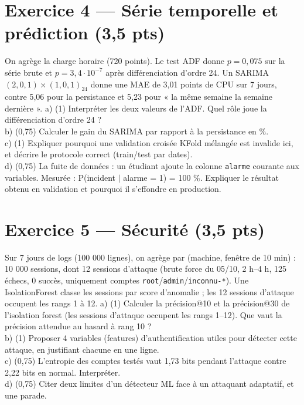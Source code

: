 \documentclass[11pt,a4paper]{article}
\newcommand{\py}[1]{\texttt{\small #1}}
\begin{document}
\section*{Exercice 4 --- Série temporelle et prédiction (3,5 pts)}
On agrège la charge horaire (720 points). Le test ADF donne $p = 0{,}075$ sur la série
brute et $p = 3{,}4\cdot10^{-7}$ après différenciation d'ordre 24.
Un SARIMA $(2,0,1)\times(1,0,1)_{24}$ donne une MAE de 3,01 points de CPU sur 7 jours,
contre 5,06 pour la persistance et 5,23 pour « la même semaine la semaine dernière ».
a) (1) Interpréter les deux valeurs de l'ADF. Quel rôle joue la différenciation d'ordre 24 ?\\
b) (0,75) Calculer le gain du SARIMA par rapport à la persistance en \%.\\
c) (1) Expliquer pourquoi une validation croisée KFold mélangée est invalide ici, et
décrire le protocole correct (train/test par dates).\\
d) (0,75) La fuite de données : un étudiant ajoute la colonne \py{alarme} courante aux
variables. Mesurée : P(incident $\mid$ alarme = 1) = 100 \%. Expliquer le résultat obtenu
en validation et pourquoi il s'effondre en production.

\section*{Exercice 5 --- Sécurité (3,5 pts)}
Sur 7 jours de logs (100 000 lignes), on agrège par (machine, fenêtre de 10 min) :
10 000 sessions, dont 12 sessions d'attaque (brute force du 05/10, 2 h--4 h,
125 échecs, 0 succès, uniquement comptes \py{root}/\py{admin}/\py{inconnu-*}).
Une IsolationForest classe les sessions par score d'anomalie ; les 12 sessions
d'attaque occupent les rangs 1 à 12.
a) (1) Calculer la précision@10 et la précision@30 de l'isolation forest (les sessions
d'attaque occupent les rangs 1--12). Que vaut la précision attendue au hasard à rang 10 ?\\
b) (1) Proposer 4 variables (features) d'authentification utiles pour détecter cette
attaque, en justifiant chacune en une ligne.\\
c) (0,75) L'entropie des comptes testés vaut 1,73 bits pendant l'attaque contre 2,22 bits
en normal. Interpréter.\\
d) (0,75) Citer deux limites d'un détecteur ML face à un attaquant adaptatif, et une parade.
\end{document}
